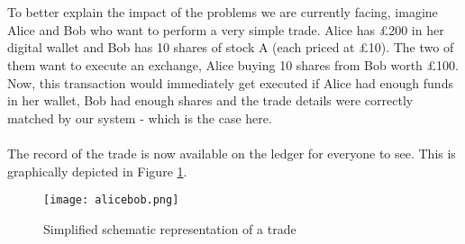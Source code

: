 \documentclass[12pt,twoside]{article}
\begin{document}
\\ \\
To better explain the impact of the problems we are currently facing, imagine Alice and Bob who want to perform a very simple trade. Alice has \pounds 200 in her digital wallet and Bob has 10 shares of stock A (each priced at \pounds 10). The two of them want to execute an exchange, Alice buying 10 shares from Bob worth \pounds 100. Now, this transaction would immediately get executed if Alice had enough funds in her wallet, Bob had enough shares and the trade details were correctly matched by our system - which is the case here.
\\ \\
The record of the trade is now available on the ledger for everyone to see. This is graphically depicted in Figure \ref{fig:tradescheme}.
 
\begin{figure}[H]
\centering
\texttt{[image: alicebob.png]}
\caption{Simplified schematic representation of a trade}
\centering
\label{fig:tradescheme}
\end{figure}
\end{document}
